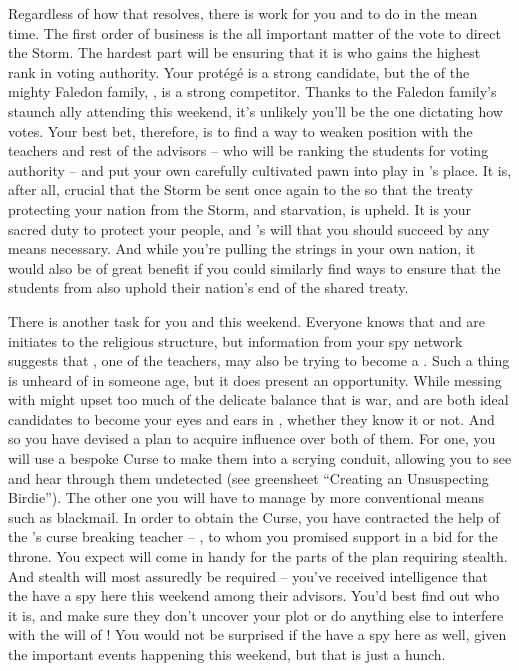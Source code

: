 \documentclass[char]{GL2020}
\begin{document}
Regardless of how that resolves, there is work for you and \cScholarship{} to do in the mean time. The first order of business is the all important matter of the vote to direct the Storm. The hardest part will be ensuring that it is \cScholarship{} who gains the highest rank in voting authority. Your protégé is a strong candidate, but the \cHeir{\child} of the mighty Faledon family, \cHeir{\full}, is a strong competitor. Thanks to the Faledon family's staunch ally \cDiplomat{\full} attending this weekend, it's unlikely you'll be the one dictating how \cHeir{} votes. Your best bet, therefore, is to find a way to weaken \cHeir{\their} position with the \pShip{} teachers and rest of the \pTech{} advisors -- who will be ranking the \pTech{} students for voting authority -- and put your own carefully cultivated pawn into play in \cHeir{}'s place. It is, after all, crucial that the Storm be sent once again to the \pShip{} so that the treaty protecting your nation from the Storm, and starvation, is upheld. It is your sacred duty to protect your people, and \cTechGod{}'s will that you should succeed by any means necessary. And while you're pulling the strings in your own nation, it would also be of great benefit if you could similarly find ways to ensure that the students from \pFarm{} also uphold their nation's end of the shared treaty.

There is another task for you and \cScholarship{} this weekend. Everyone knows that \cInitiate{\full} and \cWarlordDaughter{\full} are initiates to the \pShip{} religious structure, but information from your spy network suggests that \cPirate{\full}, one of the teachers, may also be trying to become a \cPirate{\cleric}. Such a thing is unheard of in someone \cPirate{\their} age, but it does present an opportunity. While messing with \cWarlordDaughter{} might upset too much of the delicate balance that is war, \cInitiate{} and \cPirate{} are both ideal candidates to become your eyes and ears in \pShip{}, whether they know it or not. And so you have devised a plan to acquire influence over both of them. For one, you will use a bespoke Curse to make them into a scrying conduit, allowing you to see and hear through them undetected (see greensheet ``Creating an Unsuspecting Birdie''). The other one you will have to manage by more conventional means such as blackmail. In order to obtain the Curse, you have contracted the help of the \pSc{}'s curse breaking teacher -- \cPrince{\full}, to whom you promised support in a bid for the throne. You expect \cScholarship{} will come in handy for the parts of the plan requiring stealth. And stealth will most assuredly be required – you've received intelligence that the \pShip{} have a spy here this weekend among their advisors. You'd best find out who it is, and make sure they don't uncover your plot or do anything else to interfere with the will of \cTechGod{}! You would not be surprised if the \pFarm{} have a spy here as well, given the important events happening this weekend, but that is just a hunch.
\end{document}
